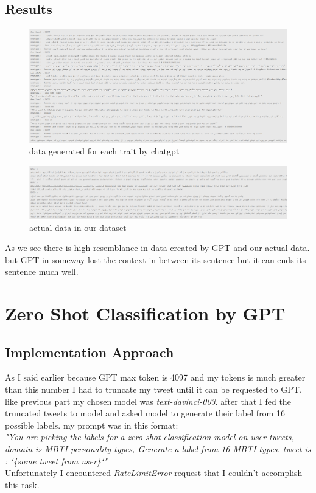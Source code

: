 \documentclass[10pt, a4paper]{article}
\begin{document}
\subsection{Results}
\begin{figure}[H]
    \begin{center}
        \includegraphics[width=1\linewidth]{./images/data-aug.png}
        \caption{data generated for each trait by chatgpt}
    \end{center}
\end{figure}

\begin{figure}[H]
    \begin{center}
        \includegraphics[width=1\linewidth]{./images/actual-data.png}
        \caption{actual data in our dataset}
    \end{center}
\end{figure}
As we see there is high resemblance in data created by GPT and our actual data. but GPT in someway lost the context in between its sentence
but it can ends its sentence much well.

\section{Zero Shot Classification by GPT}
\subsection{Implementation Approach}
As I said earlier because GPT max token is 4097 and my tokens is much greater than this number I had to truncate my tweet until it can be requested to GPT.
like previous part my chosen model was \textit{text-davinci-003}. after that I fed the truncated tweets to model and asked model to generate their label from 16 possible labels.
my prompt was in this format:
\\
\textit{"You are picking the labels for a zero shot classification model on user tweets, domain is MBTI personality types, Generate a label from 16 MBTI types. tweet is : `\{some tweet from user\}`"}
\\
Unfortunately I encountered \textit{RateLimitError} request that I couldn't accomplish this task.
\end{document}
